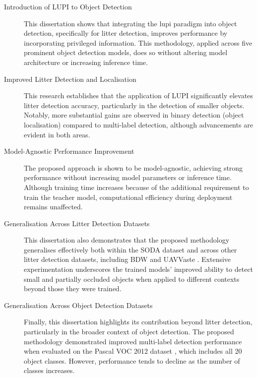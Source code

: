 \begin{description}
    \item [Introduction of LUPI to Object Detection]  
    This dissertation shows that integrating the \gls{lupi} paradigm into object detection, specifically for litter detection, improves performance by incorporating privileged information. This methodology, applied across five prominent object detection models, does so without altering model architecture or increasing inference time.

    \item [Improved Litter Detection and Localisation]  
    This research establishes that the application of LUPI significantly elevates litter detection accuracy, particularly in the detection of smaller objects. Notably, more substantial gains are observed in binary detection (object localisation) compared to multi-label detection, although advancements are evident in both areas.

    \item [Model-Agnostic Performance Improvement]  
    The proposed approach is shown to be model-agnostic, achieving strong performance without increasing model parameters or inference time. Although training time increases because of the additional requirement to train the teacher model, computational efficiency during deployment remains unaffected.

    \item [Generalisation Across Litter Detection Datasets]  
    This dissertation also demonstrates that the proposed methodology generalises effectively both within the SODA dataset \cite{soda_dataset} and across other litter detection datasets, including BDW \cite{bdwdataset} and UAVVaste \cite{uavvaste}. Extensive experimentation underscores the trained models' improved ability to detect small and partially occluded objects when applied to different contexts beyond those they were trained.

    \item [Generalisation Across Object Detection Datasets]  
    Finally, this dissertation highlights its contribution beyond litter detection, particularly in the broader context of object detection. The proposed methodology demonstrated improved multi-label detection performance when evaluated on the Pascal VOC 2012 dataset \cite{pascal-voc-2012}, which includes all 20 object classes. However, performance tends to decline as the number of classes increases.


\end{description}

